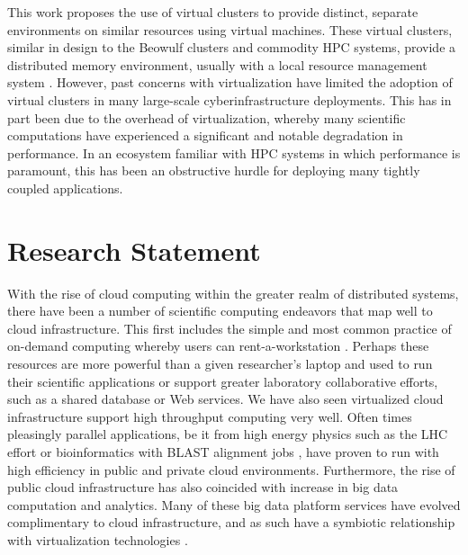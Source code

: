 This work proposes the use of virtual clusters \cite{Foster2006} to provide distinct, separate environments on similar resources using virtual machines. These virtual clusters, similar in design to the Beowulf clusters and commodity HPC systems, provide a distributed memory environment, usually with a local resource management system \cite{czajkowski1998resource}.  However, past concerns with virtualization have limited the adoption of virtual clusters in many large-scale cyberinfrastructure deployments. This has in part been due to the overhead of virtualization, whereby many scientific computations have experienced a significant and notable degradation in performance.  In an ecosystem familiar with HPC systems in which performance is paramount, this has been an obstructive hurdle for deploying many tightly coupled applications. 


\section{Research Statement}
\label{sec:stmt}


With the rise of cloud computing within the greater realm of distributed systems, there have been a number of scientific computing endeavors that map well to cloud infrastructure. This first includes the simple and most common practice of on-demand computing whereby users can rent-a-workstation \cite{kondo2009cost}. Perhaps these resources are more powerful than a given researcher's laptop and used to run their scientific applications or support greater laboratory collaborative efforts, such as a shared database or Web services.  We have also seen virtualized cloud infrastructure support high throughput computing very well. Often times pleasingly parallel applications, be it from high energy physics such as the LHC effort \cite{buncic2010cernvm, bell2015scaling} or bioinformatics with BLAST alignment jobs \cite{menon2012cloud}, have proven to run with high efficiency in public and private cloud environments. Furthermore, the rise of public cloud infrastructure has also coincided with increase in big data computation and analytics.  Many of these big data platform services have evolved complimentary to cloud infrastructure, and as such have a symbiotic relationship with virtualization technologies \cite{gunarathne2010mapreduce}.  

